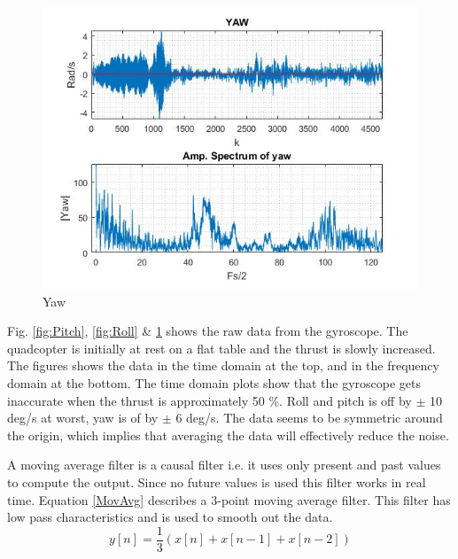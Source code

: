 \begin{figure}[H]
            \hfill
            \begin{minipage}[b]{0.32\textwidth}
                \includegraphics[width =\textwidth, angle =0]{VAPIQ-PICTURES/YAW1.jpg}
                \caption{Yaw}
                \label{fig:Yaw}
            \end{minipage}
\end{figure}
Fig. \ref{fig:Pitch}, \ref{fig:Roll} \& \ref{fig:Yaw} shows the raw data from the gyroscope. The quadcopter is initially at rest on a flat table and the thrust is slowly increased. The figures shows the data in the time domain at the top, and in the frequency domain at the bottom. The time domain plots show that the gyroscope gets inaccurate when the thrust is approximately 50 \%. Roll and pitch is off by $\pm$ 10 deg/s at worst, yaw is of by $\pm$ 6 deg/s. The data seems to be symmetric around the origin, which implies that averaging the data will effectively reduce the noise. \bigskip 

A moving average filter is a causal filter i.e. it uses only present and past values to compute the output. Since no future values is used this filter works in real time. Equation \ref{MovAvg} describes a 3-point moving average filter. This filter has low pass characteristics and is used to smooth out the data.
\begin{equation}
    \label{MovAvg}
    y[n] = \frac{1}{3}(x[n] + x[n-1] + x[n-2])
\end{equation}

